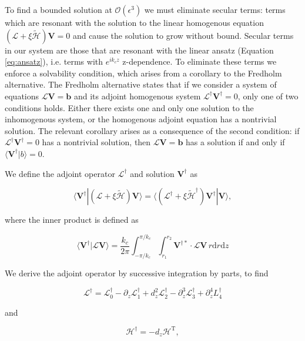\documentclass{emulateapj}
\newcommand{\beq}{\begin{equation}}
\newcommand{\eeq}{\end{equation}}
\begin{document}
To find a bounded solution at $\mathcal{O}(\epsilon^3)$ we must eliminate secular terms: terms which are resonant with the solution to the linear homogenous equation $(\mathcal{L} + \xi \widetilde{\mathcal{H}}) \mathbf{V} = 0$ and cause the solution to grow without bound. Secular terms in our system are those that are resonant with the linear ansatz (Equation \ref{eq:ansatz}), i.e. terms with $e^{i k_c z}$ z-dependence. To eliminate these terms we enforce a solvability condition, which arises from a corollary to the Fredholm alternative. The Fredholm alternative states that if we consider a system of equations $\mathcal{L} \mathbf{V} = \mathbf{b}$ and its adjoint homogenous system $\mathcal{L}^\dagger \mathbf{V}^\dagger = 0$, only one of two conditions holds. Either there exists one and only one solution to the inhomogenous system, or the homogenous adjoint equation has a nontrivial solution. The relevant corollary arises as a consequence of the second condition: if $\mathcal{L}^\dagger \mathbf{V}^\dagger = 0$ has a nontrivial solution, then $\mathcal{L} \mathbf{V} = \mathbf{b}$ has a solution if and only if $\langle \mathbf{V}^\dagger | b \rangle = 0$. 

We define the adjoint operator $\mathcal{L}^\dagger$ and solution $\mathbf{V}^\dagger$ as 

\beq
\langle \mathbf{V^\dagger} | (\mathcal{L} + \xi \widetilde{\mathcal{H}}) \mathbf{V} \rangle = \langle (\mathcal{L}^\dagger + \xi \widetilde{\mathcal{H}}^\dagger) \mathbf{V}^\dagger | \mathbf{V} \rangle,
\eeq

where the inner product is defined as 

\beq\label{eq:inner_product_def}
\langle \mathbf{V^\dagger} | \mathcal{L} \mathbf{V} \rangle = \frac{k_c}{2\pi} \int_{-\pi/k_c}^{\pi/k_c} \int_{r_1}^{r_2} \mathbf{V}^{\dagger*} \cdot \mathcal{L} \mathbf{V} \, r \mathrm{d} r \mathrm{d} z
\eeq

We derive the adjoint operator by successive integration by parts, to find 

\beq
\mathcal{L}^\dagger = \mathcal{L}_0^\dagger - \partial_z \mathcal{L}_1^\dagger + d_z^2 \mathcal{L}_2^\dagger - \partial_z^3 \mathcal{L}_3^\dagger + \partial_z^4 L_4^\dagger
\eeq

and 

\beq
\mathcal{H}^\dagger = - d_z \mathcal{H}^\mathrm{T},
\eeq
\end{document}
